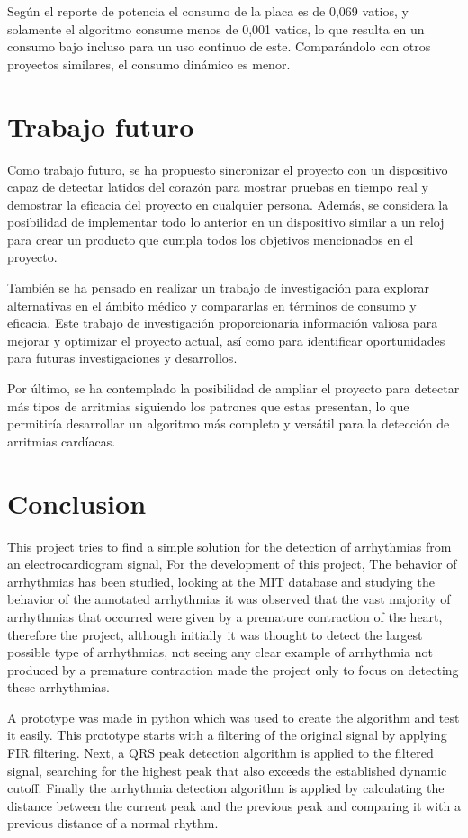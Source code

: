 Según el reporte de potencia el consumo de la placa es de 0,069 vatios, y solamente el algoritmo consume menos de 0,001 vatios, lo que resulta en un consumo bajo incluso para un uso continuo de este. Comparándolo con otros proyectos similares, el consumo dinámico es menor.

\chapter{Trabajo futuro}

Como trabajo futuro, se ha propuesto sincronizar el proyecto con un dispositivo capaz de detectar latidos del corazón para mostrar pruebas en tiempo real y demostrar la eficacia del proyecto en cualquier persona. Además, se considera la posibilidad de implementar todo lo anterior en un dispositivo similar a un reloj para crear un producto que cumpla todos los objetivos mencionados en el proyecto.

También se ha pensado en realizar un trabajo de investigación para explorar alternativas en el ámbito médico y compararlas en términos de consumo y eficacia. Este trabajo de investigación proporcionaría información valiosa para mejorar y optimizar el proyecto actual, así como para identificar oportunidades para futuras investigaciones y desarrollos.

Por último, se ha contemplado la posibilidad de ampliar el proyecto para detectar más tipos de arritmias siguiendo los patrones que estas presentan, lo que permitiría desarrollar un algoritmo más completo y versátil para la detección de arritmias cardíacas.

\chapter*{Conclusion}

This project tries to find a simple solution for the detection of arrhythmias from an electrocardiogram signal, For the development of this project, 
The behavior of arrhythmias has been studied, looking at the MIT database and studying the behavior of the annotated arrhythmias it was observed that the vast majority of arrhythmias that occurred were given by a premature contraction of the heart, therefore the project, although initially it was thought to detect the largest possible type of arrhythmias, not seeing any clear example of arrhythmia not produced by a premature contraction made the project only to focus on detecting these arrhythmias.

A prototype was made in python which was used to create the algorithm and test it easily. This prototype starts with a filtering of the original signal by applying FIR filtering. Next, a QRS peak detection algorithm is applied to the filtered signal, searching for the highest peak that also exceeds the established dynamic cutoff. Finally the arrhythmia detection algorithm is applied by calculating the distance between the current peak and the previous peak and comparing it with a previous distance of a normal rhythm.

